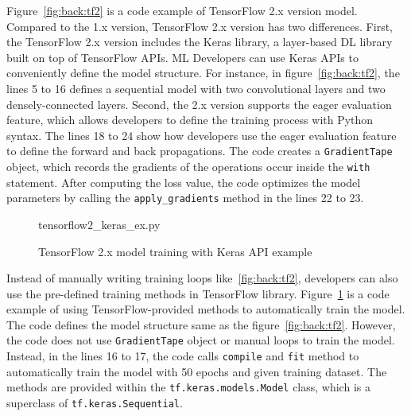 Figure~\ref{fig:back:tf2} is a code example of TensorFlow 2.x version model.
Compared to the 1.x version, TensorFlow 2.x version has two differences.
First, the TensorFlow 2.x version includes the Keras library, a layer-based
DL library built on top of TensorFlow APIs.
ML Developers can use Keras APIs to conveniently define the model structure.
For instance, in figure~\ref{fig:back:tf2},
the lines 5 to 16 defines a sequential model with two convolutional layers and
two densely-connected layers.
Second, the 2.x version supports the eager evaluation feature, which allows
developers to define the training process with Python syntax.
The lines 18 to 24 show how developers use the eager evaluation feature
to define the forward and back propagations. 
The code creates a {\tt GradientTape} object, which records the gradients
of the operations occur inside the {\tt with} statement.
After computing the loss value,
the code optimizes the model parameters by calling the 
{\tt apply\_gradients} method in the lines 22 to 23.

\begin{figure}[ht!]

{tensorflow2_keras_ex.py}
  \caption{TensorFlow 2.x model training with Keras API example}
\label{fig:back:tf2_keras}
\end{figure}

Instead of manually writing training loops like~\ref{fig:back:tf2}, 
developers can also use the pre-defined training methods in TensorFlow library. 
Figure~\ref{fig:back:tf2_keras} is a code example of using
TensorFlow-provided methods to automatically train the model.
The code defines the model structure same as the figure~\ref{fig:back:tf2}.
However, the code does not use {\tt GradientTape} object or manual loops to
train the model.
Instead, in the lines 16 to 17, the code calls {\tt compile} and {\tt fit}
method to automatically train the model with 50 epochs and given training
dataset.
The methods are provided within the {\tt tf.keras.models.Model} class,
which is a superclass of {\tt tf.keras.Sequential}.

